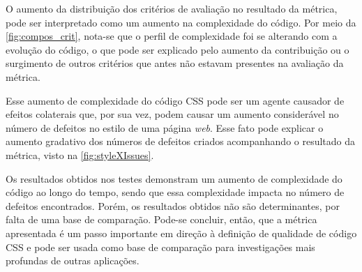O aumento da distribuição dos critérios de avaliação no resultado da métrica, pode ser interpretado como um aumento na complexidade do código. Por meio da \autoref{fig:compos_crit}, nota-se que o perfil de complexidade foi se alterando com a evolução do código, o que pode ser explicado pelo aumento da contribuição ou o surgimento de outros critérios que antes não estavam presentes na avaliação da métrica.

Esse aumento de complexidade do código CSS pode ser um agente causador de efeitos colaterais que, por sua vez, podem causar um aumento considerável no número de defeitos no estilo de uma página \textit{web}. Esse fato pode explicar o aumento gradativo dos números de defeitos criados acompanhando o resultado da métrica, visto na \autoref{fig:styleXIssues}.

Os resultados obtidos nos testes demonstram um aumento de complexidade do código ao longo do tempo, sendo que essa complexidade impacta no número de defeitos encontrados. Porém, os resultados obtidos não são determinantes, por falta de uma base de comparação. Pode-se concluir, então, que a métrica apresentada é um passo importante em direção à definição de qualidade de código CSS e pode ser usada como base de comparação para investigações mais profundas de outras aplicações.